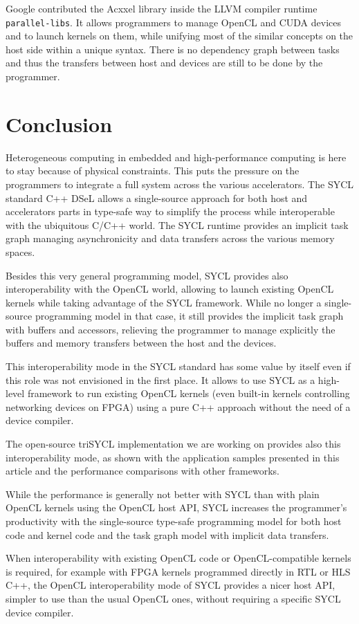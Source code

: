 \documentclass[sigplan]{acmart}
\begin{document}
Google contributed the Acxxel library \cite{Acxxel-4.0} inside the
LLVM compiler runtime \texttt{parallel-libs}. It allows programmers to manage
OpenCL and CUDA devices and to launch kernels on them, while unifying
most of the similar concepts on the host side within a unique
syntax. There is no dependency graph between tasks and thus the
transfers between host and devices are still to be done by the
programmer.


\section{Conclusion}
\label{sec:conclusion}

Heterogeneous computing in embedded and high-performance computing is
here to stay because of physical constraints. This puts the pressure on
the programmers to integrate a full system across the various
accelerators. The SYCL standard C++ DSeL allows a single-source
approach for both host and accelerators parts in type-safe way to
simplify the process while interoperable with the ubiquitous C/C++
world. The SYCL runtime provides an implicit task graph managing
asynchronicity and data transfers across the various memory spaces.

Besides this very general programming model, SYCL provides also
interoperability with the OpenCL world, allowing to launch existing
OpenCL kernels while taking advantage of the SYCL framework. While no
longer a single-source programming model in that case, it still
provides the implicit task graph with buffers and accessors, relieving
the programmer to manage explicitly the buffers and memory transfers
between the host and the devices.

This interoperability mode in the SYCL standard has some value by
itself even if this role was not envisioned in the first place. It
allows to use SYCL as a high-level framework to run existing OpenCL
kernels (even built-in kernels controlling networking devices on
FPGA) using a pure C++ approach without the need of a device compiler.

The open-source triSYCL implementation \cite{triSYCL} we are working
on provides also this interoperability mode, as shown with the
application samples presented in this article and the performance
comparisons with other frameworks.

While the performance is generally not better with SYCL than with
plain OpenCL kernels using the OpenCL host API, SYCL increases the
programmer's productivity with the single-source type-safe programming
model for both host code and kernel code and the task graph model with
implicit data transfers.

When interoperability with existing OpenCL code or OpenCL-compatible
kernels is required, for example with FPGA kernels programmed directly
in RTL or HLS C++, the OpenCL interoperability mode of SYCL provides a
nicer host API, simpler to use than the usual OpenCL ones, without
requiring a specific SYCL device compiler.




\end{document}
